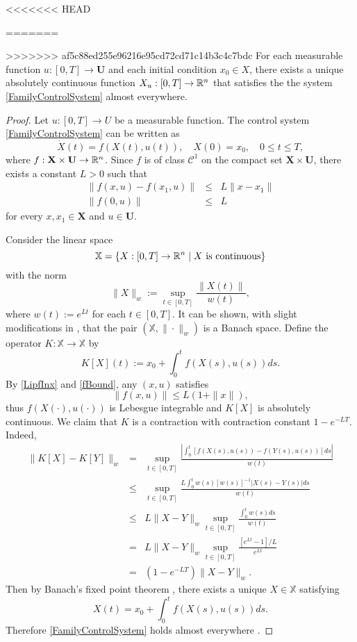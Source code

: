 <<<<<<< HEAD
\begin{theorem}
=======
\begin{theorem}\label{ExAdmisPair}
>>>>>>> af5c88ed255e96216e95cd72cd71c14b3c4c7bdc
    For each measurable function 
	$u:[0,T]\to \mathbf{U}$ and each initial condition $x_0\in X$,
	there exists a unique absolutely continuous function 
	$X_u:[0,T]\to \mathbb{R}^n$ that satisfies the the 
	system \eqref{FamilyControlSystem} almost everywhere. 
\end{theorem}
\begin{proof} Let $u:[0,T]\to U$ be a measurable function. The control system \eqref{FamilyControlSystem} can be written as
\[\dot{X}(t)=f(X(t),u(t)), \quad X(0)=x_0,\quad 0\leq t\leq T,\]
where $f:\mathbf{X}\times \mathbf{U}\to \mathbb{R}^n$. Since $f$ is of class $\mathcal{C}^1$ on the compact set $\mathbf{X}\times \mathbf{U}$, there exists a constant $L>0$ such that
\begin{eqnarray}
  \|f(x,u)-f(x_1,u)\| & \leq & L\|x-x_1\|\label{LipfInx}\\
  \|f(0,u)\| & \leq & L\label{fBound}
\end{eqnarray}
for every $x,x_1\in \mathbf{X}$ and $u\in \mathbf{U}$.

 Consider the linear space 
    \[\mathbb{X}=\{X:[0,T]\to \mathbb{R}^n\mid X \mbox{ is continuous}\}\] 
with the norm
    \[ \|X\|_w:=\sup_{t\in[0,T]} \frac{\|X(t)\|}{w(t)}, \]
where $w(t):=e^{Lt}$ for each $t\in [0,T]$. It can be shown, with slight modifications in \cite[Section 2.1]{Teschl}, that the pair $(\mathbb{X},\|\cdot\|_w)$ is a Banach space. Define the operator $K:\mathbb{X}\to \mathbb{X}$ by 
    \[ K[X](t):=x_0 + \int_0^t f(X(s),u(s))ds.\]
By \eqref{LipfInx} and \eqref{fBound}, any $(x,u)$ satisfies 
  \begin{equation}
      \|f(x,u)\| \leq  L(1+\|x\|),
  \end{equation}
thus $f(X(\cdot),u(\cdot))$ is Lebesgue integrable and $K[X]$ is absolutely continuous. We claim that $K$ is a contraction with contraction constant $1-e^{-LT}$. Indeed,
    \begin{eqnarray*}
    \| K[X] - K[Y] \|_w & = & \sup_{t\in[0,T]} \frac{|\int_0^t [f(X(s),u(s)) -f(Y(s),u(s))]ds|}{w(t)}\\
        & \leq &   \sup_{t\in[0,T]} \frac{L\int_0^t w(s)[w(s)]^{-1}|X(s) -Y(s)|ds}{w(t)}\\
        &\leq &  L\|X-Y\|_w \sup_{t\in[0,T]} \frac{\int_0^t w(s)ds}{w(t)}\\
        & = &  L\|X-Y\|_w \sup_{t\in[0,T]}\frac{[e^{Lt}-1]/L}{e^{Lt}}\\
        & = &  (1-e^{-LT})\|X-Y\|_w. 
    \end{eqnarray*}
    Then by Banach's fixed point theorem \cite[Theorem 2.1]{Teschl}, there exists a unique $X\in 
    \mathbb{X}$ 
    satisfying 
        \[ X(t)=x_0 + \int_0^t f(X(s),u(s))ds.\]
    Therefore \eqref{FamilyControlSystem} holds almost everywhere 
    \cite[Corollary 5.4.1]{Loeb2016}.
\end{proof}
%
%

\end{theorem}
